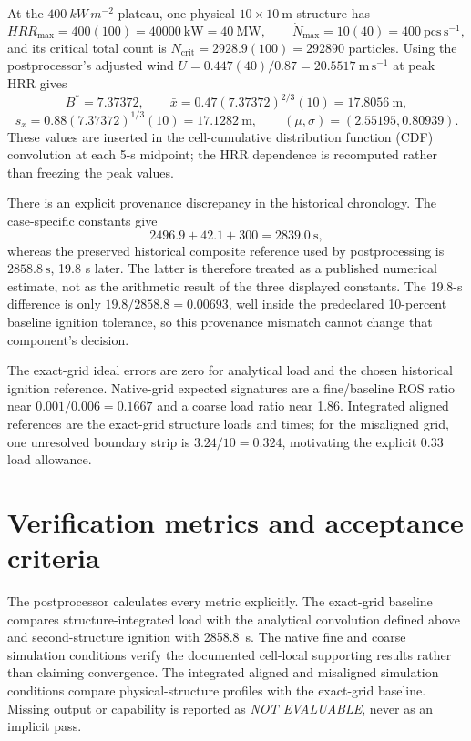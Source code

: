 At the \(\SI{400}{kW\,m^{-2}}\) plateau, one physical
\(10\times10~\mathrm{m}\) structure has
\[
 HRR_{\max}=400(100)=40000~\mathrm{kW}=40~\mathrm{MW},
 \qquad \dot N_{\max}=10(40)=400~\mathrm{pcs\,s^{-1}},
\]
and its critical total count is
\(N_{\mathrm{crit}}=2928.9(100)=292890\) particles.
Using the postprocessor's adjusted wind
\(U=0.447(40)/0.87=20.5517~\mathrm{m\,s^{-1}}\) at peak HRR gives
\[
 B^*=7.37372,\qquad
 \bar x=0.47(7.37372)^{2/3}(10)=17.8056~\mathrm{m},
\]
\[
 s_x=0.88(7.37372)^{1/3}(10)=17.1282~\mathrm{m},\qquad
 (\mu,\sigma)=(2.55195,0.80939).
\]
These values are inserted in the cell-cumulative distribution function (CDF) convolution at each 5-s midpoint;
the HRR dependence is recomputed rather than freezing the peak values.

There is an explicit provenance discrepancy in the historical chronology.
The case-specific constants give
\[
 2496.9+42.1+300=2839.0~\mathrm{s},
\]
whereas the preserved historical composite reference used by postprocessing
is \(2858.8~\mathrm{s}\), 19.8 s later.  The latter is therefore treated as
a published numerical estimate, not as the arithmetic result of the three
displayed constants.  The 19.8-s difference is only
\(19.8/2858.8=0.00693\), well inside the predeclared 10-percent baseline
ignition tolerance, so this provenance mismatch cannot change that component's
decision.

The exact-grid ideal errors are zero for analytical load and the chosen
historical ignition reference.  Native-grid expected signatures are a
fine/baseline ROS ratio near \(0.001/0.006=0.1667\) and a coarse load ratio
near 1.86.  Integrated aligned references are the exact-grid structure loads
and times; for the misaligned grid, one unresolved boundary strip is
\(3.24/10=0.324\), motivating the explicit 0.33 load allowance.

\section{Verification metrics and acceptance criteria}

The postprocessor calculates every metric explicitly. The exact-grid baseline
compares structure-integrated load with the analytical convolution defined
above and second-structure ignition with \SI{2858.8}{s}. The native fine and
coarse simulation conditions verify the documented cell-local supporting results rather than claiming
convergence. The integrated aligned and misaligned simulation conditions compare
physical-structure profiles with the exact-grid baseline. Missing output or
capability is reported as
\emph{NOT EVALUABLE}, never as an implicit pass.

